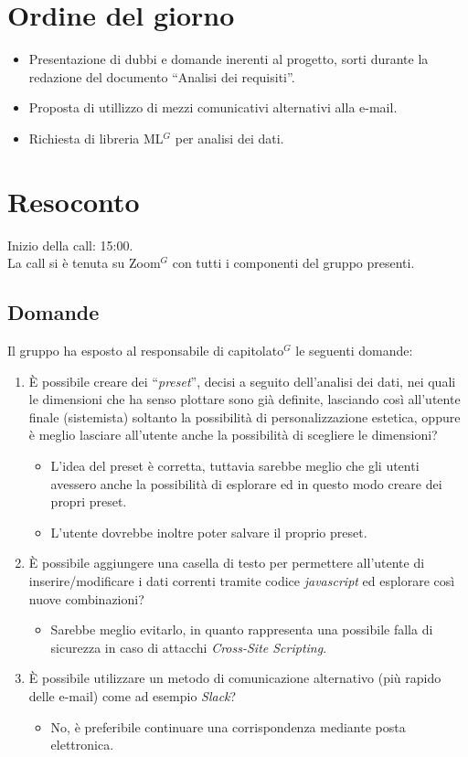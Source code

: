 \section{Ordine del giorno}

\begin{itemize}
	\item Presentazione di dubbi e domande inerenti al progetto, sorti durante la redazione del documento ``Analisi dei requisiti''.
	\item Proposta di utillizzo di mezzi comunicativi alternativi alla e-mail.
	\item Richiesta di libreria ML$^{G}$ per analisi dei dati.
\end{itemize}

\section{Resoconto}

\noindent 
Inizio della call: 15:00. \\
\noindent La call si è tenuta su Zoom$^{G}$ con tutti i componenti del gruppo presenti.
\subsection{Domande}
Il gruppo ha esposto al responsabile di capitolato$^{G}$ le seguenti domande:
\begin{enumerate}
	\item È possibile creare dei ``\textit{preset}'', decisi a seguito dell'analisi dei dati, nei quali le dimensioni che ha senso plottare sono già definite, lasciando così all'utente finale (sistemista) soltanto la possibilità di personalizzazione estetica, oppure è meglio lasciare all'utente anche la possibilità di scegliere le dimensioni?
	\begin{itemize}
		\item L'idea del preset è corretta, tuttavia sarebbe meglio che gli utenti avessero anche la possibilità di esplorare ed in questo modo creare dei propri preset.
		\item L'utente dovrebbe inoltre poter salvare il proprio preset.
	\end{itemize}
	\item È possibile aggiungere una casella di testo per permettere all'utente di inserire/modificare i dati correnti tramite codice \textit{javascript} ed esplorare così nuove combinazioni?
	\begin{itemize}
		\item Sarebbe meglio evitarlo, in quanto rappresenta una possibile falla di sicurezza in caso di attacchi \textit{Cross-Site Scripting}.
	\end{itemize}
	\item È possibile utilizzare un metodo di comunicazione alternativo (più rapido delle e-mail) come ad esempio \textit{Slack}?
	\begin{itemize}
		\item No, è preferibile continuare una corrispondenza mediante posta elettronica.
	\end{itemize}
	
\end{enumerate}

